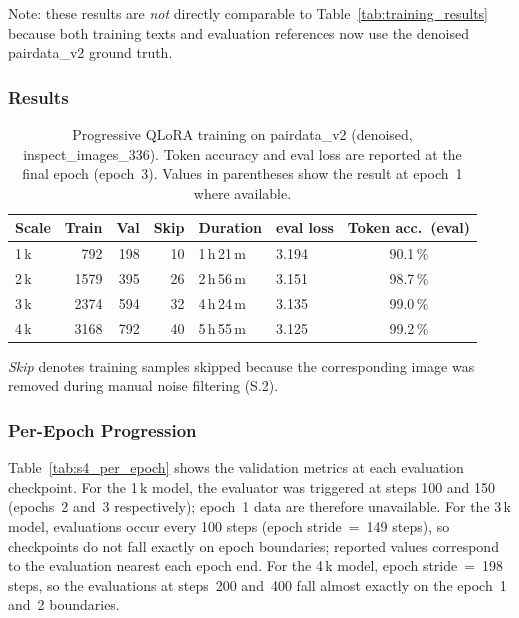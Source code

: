 ﻿\documentclass[onecolumn]{article}
\begin{document}
Note: these results are \emph{not} directly comparable to
Table~\ref{tab:training_results} because both training texts and
evaluation references now use the denoised pairdata\_v2 ground truth.

\subsubsection*{Results}

\begin{table}[h]
\centering
\caption{%
  Progressive QLoRA training on pairdata\_v2 (denoised, inspect\_images\_336).
  Token accuracy and eval loss are reported at the final epoch (epoch~3).
  Values in parentheses show the result at epoch~1 where available.}
\label{tab:s4_progressive}
\small
\begin{tabular}{lrrrllc}
\toprule
\textbf{Scale} &
\textbf{Train} &
\textbf{Val} &
\textbf{Skip} &
\textbf{Duration} &
\textbf{eval loss} &
\textbf{Token acc.\ (eval)} \\
\midrule
1\,k & 792  & 198 & 10  & 1\,h\,21\,m & 3.194 & 90.1\,\% \\
2\,k & 1579 & 395 & 26  & 2\,h\,56\,m & 3.151 & 98.7\,\% \\
3\,k & 2374 & 594 & 32  & 4\,h\,24\,m & 3.135 & 99.0\,\% \\
4\,k & 3168 & 792 & 40  & 5\,h\,55\,m & 3.125 & 99.2\,\% \\
\bottomrule
\end{tabular}
\end{table}

\noindent
\textit{Skip} denotes training samples skipped because the corresponding
image was removed during manual noise filtering (S.2).

\subsubsection*{Per-Epoch Progression}

Table~\ref{tab:s4_per_epoch} shows the validation metrics at each
evaluation checkpoint.
For the 1\,k model, the evaluator was triggered at steps 100 and 150
(epochs~2 and~3 respectively); epoch~1 data are therefore unavailable.
For the 3\,k model, evaluations occur every 100 steps (epoch stride~=~149
steps), so checkpoints do not fall exactly on epoch boundaries;
reported values correspond to the evaluation nearest each epoch end.
For the 4\,k model, epoch stride~=~198 steps, so the evaluations at
steps~200 and~400 fall almost exactly on the epoch~1 and~2 boundaries.
\end{document}
